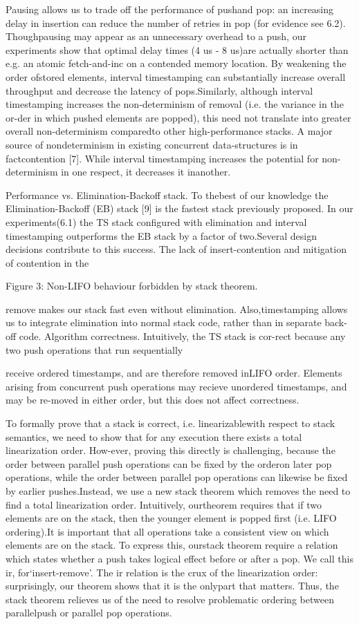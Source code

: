 Pausing allows us to trade off the performance of pushand pop: an increasing
delay in insertion can reduce the number of retries in pop (for evidence see
6.2). Thoughpausing may appear as an unnecessary overhead to a push, our
experiments show that optimal delay times (4 us - 8 us)are actually shorter
than e.g. an atomic fetch-and-inc on a contended memory location. By weakening
the order ofstored elements, interval timestamping can substantially increase
overall throughput and decrease the latency of pops.Similarly, although
interval timestamping increases the non-determinism of removal (i.e. the
variance in the or-der in which pushed elements are popped), this need not
translate into greater overall non-determinism comparedto other
high-performance stacks. 
A major source of nondeterminism in existing concurrent data-structures is in factcontention [7]. While interval timestamping increases the potential for non-determinism in one respect, it decreases it inanother.

Performance vs. Elimination-Backoff stack. To thebest of our knowledge the
Elimination-Backoff (EB) stack [9] is the fastest stack previously proposed. In
our experiments(6.1) the TS stack configured with elimination and interval timestamping outperforms the EB stack by a factor of two.Several design decisions contribute to this success. The lack
of insert-contention and mitigation of contention in the

Figure 3: Non-LIFO behaviour forbidden by stack theorem.

remove makes our stack fast even without elimination. Also,timestamping allows us to integrate elimination into normal
stack code, rather than in separate back-off code.
Algorithm correctness. Intuitively, the TS stack is cor-rect because any two push operations that run sequentially

receive ordered timestamps, and are therefore removed inLIFO order. Elements arising from concurrent push operations may recieve unordered timestamps, and may be re-moved in either order, but this does not affect correctness.

To formally prove that a stack is correct, i.e. linearizablewith respect to stack semantics, we need to show that for
any execution there exists a total linearization order. How-ever, proving this directly is challenging, because the order
between parallel push operations can be fixed by the orderon later pop operations, while the order between parallel
pop operations can likewise be fixed by earlier pushes.Instead, we use a new stack theorem which removes the
need to find a total linearization order. Intuitively, ourtheorem requires that if two elements are on the stack, then
the younger element is popped first (i.e. LIFO ordering).It is important that all operations take a consistent view
on which elements are on the stack. To express this, ourstack theorem require a relation which states whether a push
takes logical effect before or after a pop. We call this ir, for`insert-remove'. The ir relation is the crux of the linearization
order: surprisingly, our theorem shows that it is the onlypart that matters. Thus, the stack theorem relieves us of
the need to resolve problematic ordering between parallelpush or parallel pop operations.

